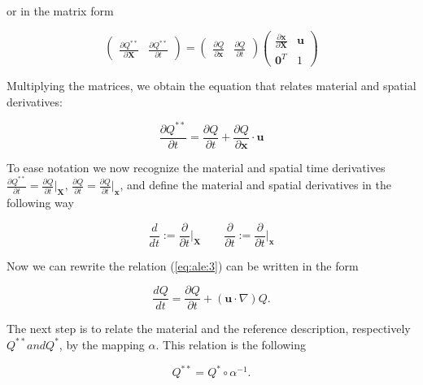 \documentclass[a4paper,11pt,openright,twoside]{book}
\begin{document}
or in the matrix form

\begin{equation}
\label{eq:ale:2}
\begin{pmatrix}
\frac{\partial Q^{**}}{\partial \mathbf{X}} & \frac{\partial Q^{**}}{\partial t}
\end{pmatrix} = 
\begin{pmatrix}
\frac{\partial Q}{\partial \mathbf{x}} & \frac{\partial Q}{\partial t}
\end{pmatrix}
\begin{pmatrix}
\frac{\partial \mathbf{x}}{\partial \mathbf{X}} & \mathbf{u}\\
\mathbf{0}^T & 1
\end{pmatrix} 
\end{equation}

Multiplying the matrices, we obtain the equation that relates material and spatial derivatives:

\begin{equation}
\label{eq:ale:3}
\frac{\partial Q^{**}}{\partial t} = \frac{\partial Q}{\partial t}
+ \frac{\partial Q}{\partial \mathbf{x}} \cdot \mathbf{u}
\end{equation}

To ease notation we now recognize the material and spatial time derivatives $\frac{\partial Q^{**}}{\partial t} = \frac{\partial Q}{\partial t} {\Big |}_\mathbf{X}, \,  \frac{\partial Q}{\partial t} = \frac{\partial Q}{\partial t} {\Big |}_\mathbf{x}$, and define the material and spatial derivatives in the following way

\begin{equation}
\frac{d}{dt} := 	\frac{\partial}{\partial t} {\Big |}_\mathbf{X} \qquad
\frac{\partial}{\partial t} := \frac{\partial}{\partial t} {\Big |}_\mathbf{x}
\end{equation}

Now we can rewrite the relation (\ref{eq:ale:3}) can be written in the form

\begin{equation}
\label{eq:ale:6}
\frac{d Q}{d t} = \frac{\partial Q}{\partial t} + (\mathbf{u} \cdot \nabla) Q.
\end{equation}

The next step is to relate the material and the reference description, respectively $Q^{**} and Q^{*}$, by the mapping $\alpha$. This relation is the following

\begin{equation}
Q^{**} = Q^{*} \circ \alpha^{-1}.
\end{equation}
\end{document}
